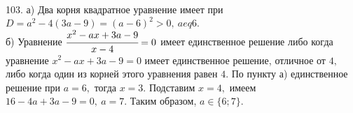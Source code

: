 103. а) Два корня квадратное уравнение имеет при $D=a^2-4(3a-9)=(a-6)^2>0,\ a
eq6.$\\
б) Уравнение $\cfrac{x^2-ax+3a-9}{x-4}=0$ имеет единственное решение либо когда уравнение $x^2-ax+3a-9=0$ имеет единственное решение, отличное от $4,$ либо когда один из корней этого уравнения равен $4.$ По пункту а) единственное решение при $a=6,$ тогда $x=3.$ Подставим $x=4,$ имеем $16-4a+3a-9=0,\ a=7.$ Таким образом, $a\in\{6;7\}.$\\
